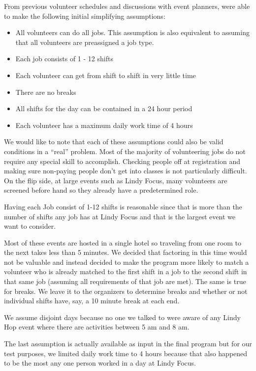 \documentclass[12pt]{article}
\theoremstyle{definition}
\begin{document}
\begin{multicols}{2}
From previous volunteer schedules and discussions with event planners, were able to make the following initial simplifying assumptions:
\begin{itemize}\itemsep0pt
\item All volunteers can do all jobs. This assumption is also equivalent to assuming that all volunteers are preassigned a job type.
\item Each job consists of 1 - 12 shifts
\item Each volunteer can get from shift to shift in very little time
\item There are no breaks
\item All shifts for the day can be contained in a 24 hour period
\item Each volunteer has a maximum daily work time of 4 hours
\end{itemize}
We would like to note that each of these assumptions could also be valid conditions in a ``real'' problem.
Most of the majority of volunteering jobs do not require any special skill to accomplish.
Checking people off at registration and making sure non-paying people don't get into classes is not particularly difficult.
On the flip side, at large events such as Lindy Focus, many volunteers are screened before hand so they already have a predetermined role.

Having each Job consist of 1-12 shifts is reasonable since that is more than the number of shifts any job has at Lindy Focus and that is the largest event we want to consider.

Most of these events are hosted in a single hotel so traveling from one room to the next takes less than 5 minutes.
We decided that factoring in this time would not be valuable and instead decided to make the program more likely to match a volunteer who is already matched to the first shift in a job to the second shift in that same job (assuming all requirements of that job are met).
The same is true for breaks.
We leave it to the organizers to determine breaks and whether or not individual shifts have, say, a 10 minute break at each end.

We assume disjoint days because no one we talked to were aware of any Lindy Hop event where there are activities between 5 am and 8 am.

The last assumption is actually available as input in the final program but for our test purposes, we limited daily work time to 4 hours because that also happened to be the most any one person worked in a day at Lindy Focus.


\end{multicols}
\end{document}

